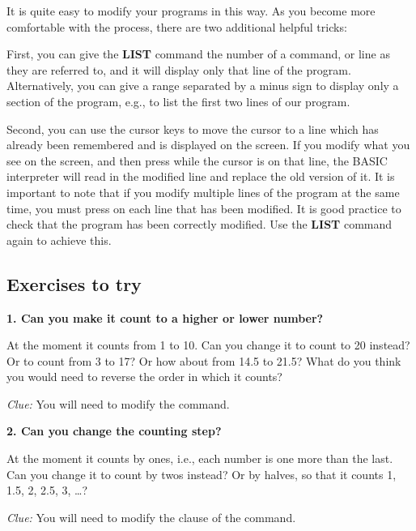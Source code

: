 
It is quite easy to modify your programs in this way.  As you become more comfortable with the process, there are two
additional helpful tricks:

First, you can give the {\bf LIST} command the number of a command, or line as they are referred to, and it will display only
that line of the program.  Alternatively, you can give a range separated by a minus sign to display only a section of the program,
e.g.,  to list the first two lines of our program.

Second, you can use the cursor keys to move the cursor to a line which has already been remembered and is displayed on the screen. If you
modify what you see on the screen, and then press  while the cursor is on that line, the BASIC interpreter will
read in the modified line and replace the old version of it.  It is important to note that if you modify multiple lines of the program
at the same time, you must press  on each line that has been modified. It is good practice to check that the
program has been correctly modified. Use the {\bf LIST} command again to achieve this.


  \subsection{Exercises to try}

  {\bf 1. Can you make it count to a higher or lower number?}

  At the moment it counts from 1 to 10.  Can you change it to count to 20 instead?  Or to count from 3 to 17?
  Or how about from 14.5 to 21.5? What do you think you would need to reverse the order in which it counts?

  {\em Clue:} You will need to modify the  command.

  {\bf 2. Can you change the counting step?}

  At the moment it counts by ones, i.e., each number is one more than the last.  Can you change it to count by twos
  instead? Or by halves, so that it counts 1, 1.5, 2, 2.5, 3, \ldots?

  {\em Clue:} You will need to modify the  clause
  of the  command.


